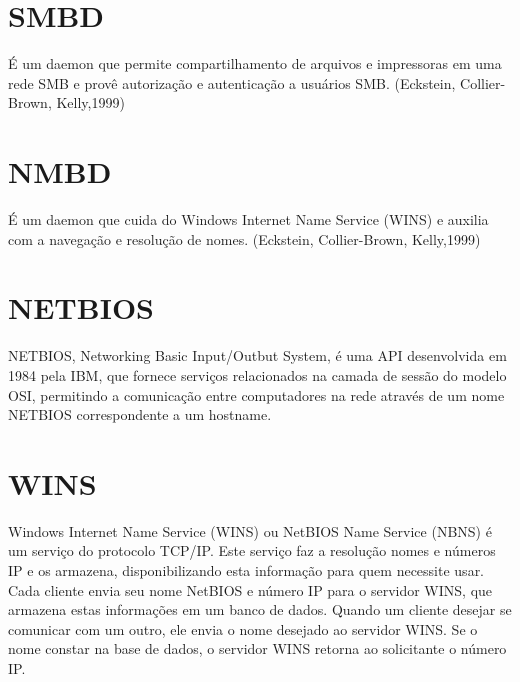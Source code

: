 
\section{SMBD}

É um daemon que permite compartilhamento de arquivos e impressoras em uma rede SMB e provê autorização e autenticação a usuários SMB. (Eckstein, Collier-Brown, Kelly,1999)

\section{NMBD}

É um daemon que cuida do Windows Internet Name Service (WINS) e auxilia com a navegação e resolução de nomes.
(Eckstein, Collier-Brown, Kelly,1999)

\section{NETBIOS}

NETBIOS, Networking Basic Input/Outbut System, é uma API desenvolvida em 1984 pela IBM, que fornece serviços relacionados na camada de sessão do modelo OSI, permitindo a comunicação entre computadores na rede através de um nome NETBIOS correspondente a um hostname.

% 
% 

\section{WINS}

Windows Internet Name Service (WINS) ou NetBIOS Name Service (NBNS) é um serviço do protocolo TCP/IP. Este serviço faz a resolução nomes e números IP e os armazena, disponibilizando esta informação para quem necessite usar. Cada cliente envia seu nome NetBIOS e número IP para o servidor WINS, que armazena estas informações em um banco de dados. Quando um cliente desejar se comunicar com um outro, ele envia o nome desejado ao servidor WINS. Se o nome constar na base de dados, o servidor WINS retorna ao solicitante o número IP.

